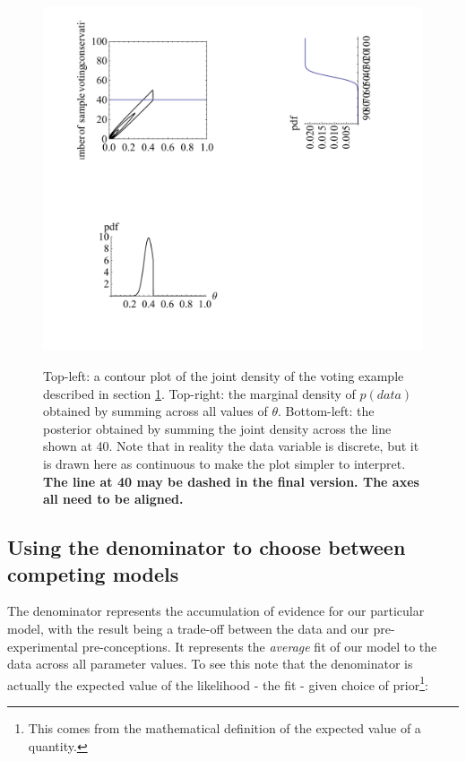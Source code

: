 \documentclass[11pt,fullpage]{book}
\begin{document}
\begin{figure}
\centering
\scalebox{0.8} 
{\includegraphics{Denominator_continuousJointDensity.pdf}}\caption{Top-left: a contour plot of the joint density of the voting example described in section \ref{fig:Denominator_continuousJointDensity}. Top-right: the marginal density of $p(data)$ obtained by summing across all values of $\theta$. Bottom-left: the posterior obtained by summing the joint density across the line shown at 40. Note that in reality the data variable is discrete, but it is drawn here as continuous to make the plot simpler to interpret. \textbf{The line at 40 may be dashed in the final version. The axes all need to be aligned.}}\label{fig:Denominator_continuousJointDensity}
\end{figure}



\subsection{Using the denominator to choose between competing models}
The denominator represents the accumulation of evidence for our particular model, with the result being a trade-off between the data and our pre-experimental pre-conceptions. It represents the \textit{average} fit of our model to the data across all parameter values. To see this note that the denominator is actually the expected value of the likelihood - the fit - given choice of prior\footnote{This comes from the mathematical definition of the expected value of a quantity.}:
\end{document}
